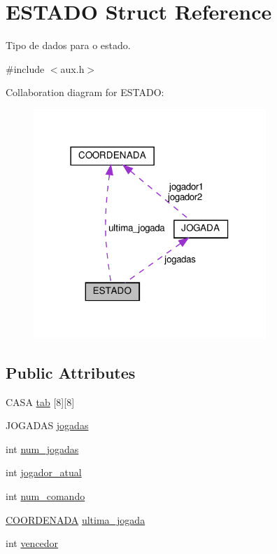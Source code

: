 \hypertarget{structESTADO}{}\section{E\+S\+T\+A\+DO Struct Reference}
\label{structESTADO}


Tipo de dados para o estado.  




{\ttfamily \#include $<$aux.\+h$>$}



Collaboration diagram for E\+S\+T\+A\+DO\+:
\nopagebreak
\begin{figure}[H]
\begin{center}
\leavevmode
\includegraphics[width=249pt]{structESTADO__coll__graph}
\end{center}
\end{figure}
\subsection*{Public Attributes}
\begin{DoxyCompactItemize}
\item 
C\+A\+SA \hyperlink{structESTADO_ab56f0f1be16954d3768b4174d14c087d}{tab} \mbox{[}8\mbox{]}\mbox{[}8\mbox{]}
\item 
J\+O\+G\+A\+D\+AS \hyperlink{structESTADO_afae43b87a488fad0f2b56a18bad31d18}{jogadas}
\item 
int \hyperlink{structESTADO_a261495728744647e618b4e623f5a4b7a}{num\+\_\+jogadas}
\item 
int \hyperlink{structESTADO_a5dd28e2e68b7aef2b6b7ea88e02eff58}{jogador\+\_\+atual}
\item 
int \hyperlink{structESTADO_adf1064dfc09145b6995a7897249f1674}{num\+\_\+comando}
\item 
\hyperlink{structCOORDENADA}{C\+O\+O\+R\+D\+E\+N\+A\+DA} \hyperlink{structESTADO_a4896a5c5c1f40b43fb795623327e3f47}{ultima\+\_\+jogada}
\item 
int \hyperlink{structESTADO_afa5918b4f2221416965663d44b14e179}{vencedor}
\end{DoxyCompactItemize}


